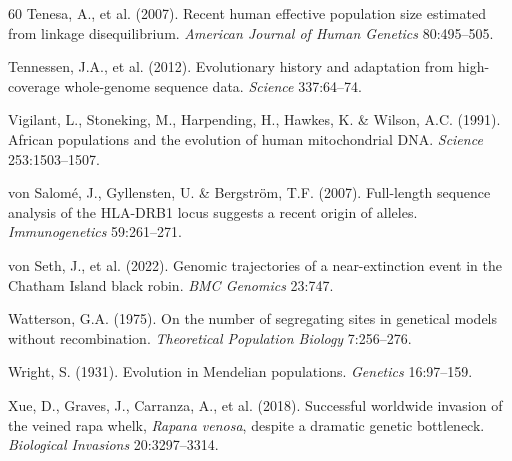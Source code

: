 \begin{thebibliography}{60}
Tenesa, A., et al. (2007). Recent human effective population size
estimated from linkage disequilibrium. \emph{American Journal of Human
Genetics} 80:495--505.

Tennessen, J.A., et al. (2012). Evolutionary history and adaptation from
high-coverage whole-genome sequence data. \emph{Science} 337:64--74.

Vigilant, L., Stoneking, M., Harpending, H., Hawkes, K. \& Wilson, A.C.
(1991). African populations and the evolution of human mitochondrial DNA.
\emph{Science} 253:1503--1507.

von Salom\'e, J., Gyllensten, U. \& Bergstr\"om, T.F. (2007). Full-length
sequence analysis of the HLA-DRB1 locus suggests a recent origin of
alleles. \emph{Immunogenetics} 59:261--271.

von Seth, J., et al. (2022). Genomic trajectories of a near-extinction
event in the Chatham Island black robin. \emph{BMC Genomics} 23:747.

Watterson, G.A. (1975). On the number of segregating sites in genetical
models without recombination. \emph{Theoretical Population Biology}
7:256--276.

Wright, S. (1931). Evolution in Mendelian populations. \emph{Genetics}
16:97--159.

Xue, D., Graves, J., Carranza, A., et al. (2018). Successful worldwide
invasion of the veined rapa whelk, \emph{Rapana venosa}, despite a
dramatic genetic bottleneck. \emph{Biological Invasions}
20:3297--3314.

\end{thebibliography}
